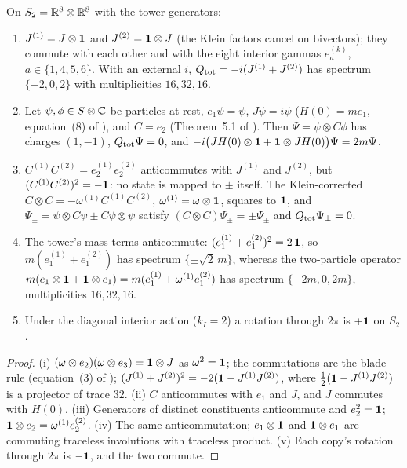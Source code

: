 \begin{proposition}
\label{d6:prop:dirac}
On $S_2=\mathbb{R}^8\otimes\mathbb{R}^8$ with the tower generators:
\begin{enumerate}[label=(\roman*),leftmargin=2.2em]
\item $J^{(1)}=J\otimes\mathbf 1$ and $J^{(2)}=\mathbf 1\otimes J$ (the Klein factors cancel on bivectors); they commute with each other and with the eight
interior gammas $e^{(k)}_a$, $a\in\{1,4,5,6\}$. With an external $i$, $Q_{\rm tot}=-i(J^{(1)}+J^{(2)})$ has spectrum $\{-2,0,2\}$ with
multiplicities $16,32,16$.
\item Let $\psi,\phi\in S\otimes\mathbb{C}$ be particles at rest, $e_1\psi=\psi$, $J\psi=i\psi$ ($H(0)=me_1$, equation~(8) of \cite{ES17}), and $C=e_2$
(Theorem~5.1 of \cite{ES17}). Then $\Psi=\psi\otimes C\phi$ has charges $(1,-1)$, $Q_{\rm tot}\Psi=0$, and
$-i\bigl(JH(0)\otimes\mathbf 1+\mathbf 1\otimes JH(0)\bigr)\Psi=2m\Psi$.
\item $C^{(1)}C^{(2)}=e^{(1)}_2e^{(2)}_2$ anticommutes with $J^{(1)}$ and $J^{(2)}$, but $(C^{(1)}C^{(2)})^2=-\mathbf 1$: no state is mapped to $\pm$ itself.
The Klein-corrected $C\otimes C=-\omega^{(1)}C^{(1)}C^{(2)}$, $\omega^{(1)}=\omega\otimes\mathbf 1$, squares to $\mathbf 1$, and $\Psi_\pm=\psi\otimes C\psi\pm C\psi\otimes\psi$
satisfy $(C\otimes C)\Psi_\pm=\pm\Psi_\pm$ and $Q_{\rm tot}\Psi_\pm=0$.
\item The tower's mass terms anticommute: $(e^{(1)}_1+e^{(2)}_1)^2=2\,\mathbf 1$, so $m(e^{(1)}_1+e^{(2)}_1)$ has spectrum $\{\pm\sqrt2\,m\}$, whereas the
two-particle operator $m(e_1\otimes\mathbf 1+\mathbf 1\otimes e_1)=m(e^{(1)}_1+\omega^{(1)}e^{(2)}_1)$ has spectrum $\{-2m,0,2m\}$, multiplicities $16,32,16$.
\item Under the diagonal interior action ($k_I=2$) a rotation through $2\pi$ is $+\mathbf 1$ on $S_2$.
\end{enumerate}
\end{proposition}

\begin{proof}
(i) $(\omega\otimes e_2)(\omega\otimes e_3)=\mathbf 1\otimes J$ as $\omega^2=\mathbf 1$; the commutations are the blade rule (equation~(3) of \cite{ES17});
$(J^{(1)}+J^{(2)})^2=-2(\mathbf 1-J^{(1)}J^{(2)})$, where $\tfrac12(\mathbf 1-J^{(1)}J^{(2)})$ is a projector of trace $32$. (ii) $C$ anticommutes with $e_1$ and $J$, and
$J$ commutes with $H(0)$. (iii) Generators of distinct constituents anticommute and $e_2^2=\mathbf 1$; $\mathbf 1\otimes e_2=\omega^{(1)}e^{(2)}_2$. (iv) The
same anticommutation; $e_1\otimes\mathbf 1$ and $\mathbf 1\otimes e_1$ are commuting traceless involutions with traceless product. (v) Each copy's rotation
through $2\pi$ is $-\mathbf 1$, and the two commute.
\end{proof}

